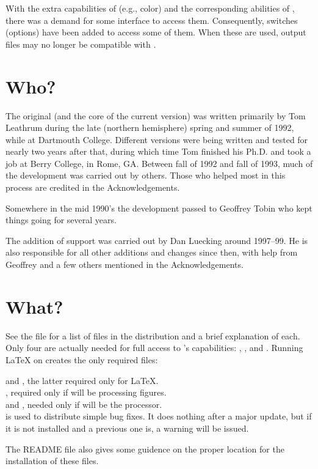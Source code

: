 \documentclass[letterpaper]{article}
\begin{document}
With the extra capabilities of \PS{} (e.g., color) and the corresponding
abilities of \MP{}, there was a demand for some \mfp{} interface to
access them. Consequently, switches (options) have been added to access
some of them. When these are used, output files may no longer be
compatible with \MF{}.

\section{Who?}\label{author}

The original \Mfp{} (and the core of the current version) was written
primarily by Tom Leathrum during the late (northern hemisphere) spring
and summer of 1992, while at Dartmouth College. Different versions were
being written and tested for nearly two years after that, during which
time Tom finished his Ph.D. and took a job at Berry College, in Rome,
GA.  Between fall of 1992 and fall of 1993, much of the development was
carried out by others.  Those who helped most in this process are
credited in the Acknowledgements.

Somewhere in the mid 1990's the development passed to Geoffrey Tobin who
kept things going for several years.

The addition of \MP{} support was carried out by Dan Luecking around
1997--99. He is also responsible for all other additions and changes
since then, with help from Geoffrey and a few others mentioned in the
Acknowledgements.

\section{What?}\label{manifest}

See the  file for a list of files in the distribution and a
brief explanation of each. Only four are actually needed for full access
to \mfp{}'s capabilities: , ,
 and . Running \LaTeX{} on
 creates the only required files:
\begin{display}
     and , the latter required only for
        \LaTeX{}.\\
    , required only if \MF{} will be processing
        figures.\\
     and , needed only if \MP{} will
        be the processor.\\
     is used to distribute simple bug fixes. It does
        nothing after a major update, but if it is not installed and a
        previous one is, a warning will be issued.
\end{display}
The README file also gives some guidence on the proper location for the
installation of these files.
\end{document}
